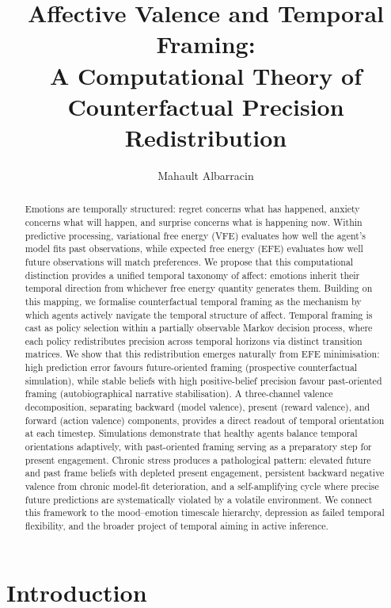 \documentclass[11pt,a4paper]{article}
\title{Affective Valence and Temporal Framing:\\
       A Computational Theory of Counterfactual Precision Redistribution}
\author{Mahault Albarracin}
\date{}
\begin{document}
\maketitle

\begin{abstract}
Emotions are temporally structured: regret concerns what has happened, anxiety concerns what will happen, and surprise concerns what is happening now. Within predictive processing, variational free energy (VFE) evaluates how well the agent's model fits past observations, while expected free energy (EFE) evaluates how well future observations will match preferences. We propose that this computational distinction provides a unified temporal taxonomy of affect: emotions inherit their temporal direction from whichever free energy quantity generates them. Building on this mapping, we formalise counterfactual temporal framing as the mechanism by which agents actively navigate the temporal structure of affect. Temporal framing is cast as policy selection within a partially observable Markov decision process, where each policy redistributes precision across temporal horizons via distinct transition matrices. We show that this redistribution emerges naturally from EFE minimisation: high prediction error favours future-oriented framing (prospective counterfactual simulation), while stable beliefs with high positive-belief precision favour past-oriented framing (autobiographical narrative stabilisation). A three-channel valence decomposition, separating backward (model valence), present (reward valence), and forward (action valence) components, provides a direct readout of temporal orientation at each timestep. Simulations demonstrate that healthy agents balance temporal orientations adaptively, with past-oriented framing serving as a preparatory step for present engagement. Chronic stress produces a pathological pattern: elevated future and past frame beliefs with depleted present engagement, persistent backward negative valence from chronic model-fit deterioration, and a self-amplifying cycle where precise future predictions are systematically violated by a volatile environment. We connect this framework to the mood--emotion timescale hierarchy, depression as failed temporal flexibility, and the broader project of temporal aiming in active inference.
\end{abstract}


\section{Introduction}\label{sec:introduction}
\end{document}
